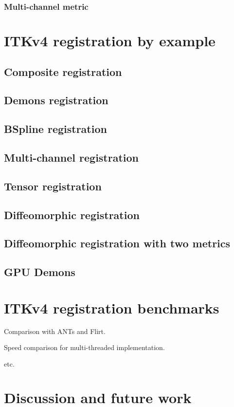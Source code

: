 \documentclass{article}
\begin{document}
\subsubsection{Multi-channel metric}


\section{ITKv4 registration by example}

\subsection{Composite registration}
\subsection{Demons registration}
\subsection{BSpline registration}
\subsection{Multi-channel registration}
\subsection{Tensor registration}
\subsection{Diffeomorphic registration}
\subsection{Diffeomorphic registration with two metrics}
\subsection{GPU Demons}

\section{ITKv4 registration benchmarks}

Comparison with ANTs and Flirt.  

Speed comparison for multi-threaded implementation.

etc.
\section{Discussion and future work}
\end{document}
